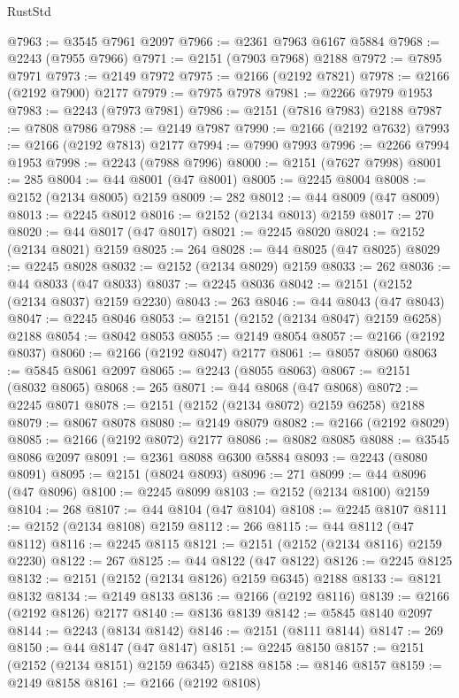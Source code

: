 \begin{lexlean}{RustStd}
\begin{coremodule}
@7963 := @3545 @7961 @2097
@7966 := @2361 @7963 @6167 @5884
@7968 := @2243 (@7955 @7966)
@7971 := @2151 (@7903 @7968) @2188
@7972 := @7895 @7971
@7973 := @2149 @7972
@7975 := @2166 (@2192 @7821)
@7978 := @2166 (@2192 @7900) @2177
@7979 := @7975 @7978
@7981 := @2266 @7979 @1953
@7983 := @2243 (@7973 @7981)
@7986 := @2151 (@7816 @7983) @2188
@7987 := @7808 @7986
@7988 := @2149 @7987
@7990 := @2166 (@2192 @7632)
@7993 := @2166 (@2192 @7813) @2177
@7994 := @7990 @7993
@7996 := @2266 @7994 @1953
@7998 := @2243 (@7988 @7996)
@8000 := @2151 (@7627 @7998)
@8001 := 285
@8004 := @44 @8001 (@47 @8001)
@8005 := @2245 @8004
@8008 := @2152 (@2134 @8005) @2159
@8009 := 282
@8012 := @44 @8009 (@47 @8009)
@8013 := @2245 @8012
@8016 := @2152 (@2134 @8013) @2159
@8017 := 270
@8020 := @44 @8017 (@47 @8017)
@8021 := @2245 @8020
@8024 := @2152 (@2134 @8021) @2159
@8025 := 264
@8028 := @44 @8025 (@47 @8025)
@8029 := @2245 @8028
@8032 := @2152 (@2134 @8029) @2159
@8033 := 262
@8036 := @44 @8033 (@47 @8033)
@8037 := @2245 @8036
@8042 := @2151 (@2152 (@2134 @8037) @2159 @2230)
@8043 := 263
@8046 := @44 @8043 (@47 @8043)
@8047 := @2245 @8046
@8053 := @2151 (@2152 (@2134 @8047) @2159 @6258) @2188
@8054 := @8042 @8053
@8055 := @2149 @8054
@8057 := @2166 (@2192 @8037)
@8060 := @2166 (@2192 @8047) @2177
@8061 := @8057 @8060
@8063 := @5845 @8061 @2097
@8065 := @2243 (@8055 @8063)
@8067 := @2151 (@8032 @8065)
@8068 := 265
@8071 := @44 @8068 (@47 @8068)
@8072 := @2245 @8071
@8078 := @2151 (@2152 (@2134 @8072) @2159 @6258) @2188
@8079 := @8067 @8078
@8080 := @2149 @8079
@8082 := @2166 (@2192 @8029)
@8085 := @2166 (@2192 @8072) @2177
@8086 := @8082 @8085
@8088 := @3545 @8086 @2097
@8091 := @2361 @8088 @6300 @5884
@8093 := @2243 (@8080 @8091)
@8095 := @2151 (@8024 @8093)
@8096 := 271
@8099 := @44 @8096 (@47 @8096)
@8100 := @2245 @8099
@8103 := @2152 (@2134 @8100) @2159
@8104 := 268
@8107 := @44 @8104 (@47 @8104)
@8108 := @2245 @8107
@8111 := @2152 (@2134 @8108) @2159
@8112 := 266
@8115 := @44 @8112 (@47 @8112)
@8116 := @2245 @8115
@8121 := @2151 (@2152 (@2134 @8116) @2159 @2230)
@8122 := 267
@8125 := @44 @8122 (@47 @8122)
@8126 := @2245 @8125
@8132 := @2151 (@2152 (@2134 @8126) @2159 @6345) @2188
@8133 := @8121 @8132
@8134 := @2149 @8133
@8136 := @2166 (@2192 @8116)
@8139 := @2166 (@2192 @8126) @2177
@8140 := @8136 @8139
@8142 := @5845 @8140 @2097
@8144 := @2243 (@8134 @8142)
@8146 := @2151 (@8111 @8144)
@8147 := 269
@8150 := @44 @8147 (@47 @8147)
@8151 := @2245 @8150
@8157 := @2151 (@2152 (@2134 @8151) @2159 @6345) @2188
@8158 := @8146 @8157
@8159 := @2149 @8158
@8161 := @2166 (@2192 @8108)

\end{coremodule}
\end{lexlean}
